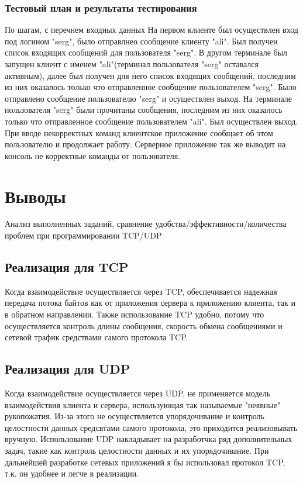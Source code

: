 \documentclass[12pt,a4paper]{report}
\begin{document}
\subsection{Тестовый план и результаты тестирования}
По шагам, с перечнем входных данных
На первом клиенте был осуществлен вход под логином "serg", было отправлнео сообщение клиенту "ali". Был получен список входящих сообщений для пользователя "serg". В другом терминале был запущен клиент с именем "ali"(терминал пользователя "serg" оставался активным), далее был получен для него список входящих сообщений, последним из них оказалось только что отправленное сообщение пользователем "serg". Было отправлено сообщение пользователю "serg" и осуществлен выход. На терминале пользователя "serg" были прочитаны сообщения, последним из них оказалось только что отправленное сообщение пользователем "ali". Был осуществлен выход.
При вводе некорректных команд клиентское приложение сообщает об этом пользователю и продолжает работу. Серверное приложение так же выводит на консоль не корректные команды от пользователя.
\chapter{Выводы}
Анализ выполненных заданий, сравнение удобства/эффективности/количества проблем при программировании TCP/UDP
\section{Реализация для TCP}
Когда взаимодействие осуществляется через TCP, обеспечивается надежная передача потока байтов как от приложения сервера к приложению клиента, так и в обратном направлении. Также использование TCP удобно, потому что осуществляется контроль длины сообщения, скорость обмена сообщениями и сетевой трафик средствами самого протокола TCP. 
\section{Реализация для UDP}
Когда взаимодействие осуществляется через UDP, не применяется модель взаимодействия клиента и сервера, использующая так называемые "неявные" рукопожатия. Из-за этого не осуществляется упорядочивание и контроль целостности данных средсвтами самого протокола, это приходится реализовывать вручную. Использование UDP накладывает на разработчка ряд дополнительных задач, такие как контроль целостности данных и их упорядочивание.
\linebreak
\linebreak
При дальнейшей разработке сетевых приложений я бы использовал протокол TCP, т.к. он удобнее и легче в реализации.
\end{document}
